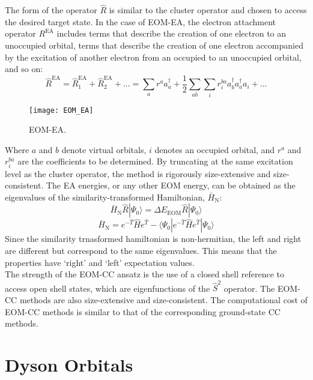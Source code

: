 The form of the operator $\hat{R}$ is similar to the cluster operator and chosen to access the desired target state. In the case of EOM-EA, the electron attachment operator $R^{\text{EA}}$ includes terms that describe the creation of one electron to an unoccupied orbital, terms that describe the creation of one electron accompanied by the excitation of another electron from an occupied to an unoccupied orbital, and so on:
\begin{equation}\label{eq:R_EA}
    \hat{R}^{\mathrm{EA}} = \hat{R}_1^{\mathrm{EA}} + \hat{R}_2^{\mathrm{EA}} + \ldots = \sum_{a} r^a a_a^{\dagger} + \frac{1}{2}\sum_{ab} \sum_{i} r^{ba}_{i} a_b^{\dagger} a_a^{\dagger} a_i + \ldots
\end{equation}
\begin{figure}
    \centering
    \medskip
    \texttt{[image: EOM\_EA]}
    \caption{EOM-EA.}
    \label{fig:EOM}
  \end{figure}
  Where $a$ and $b$ denote virtual orbitals, $i$ denotes an occupied orbital, and $r^a$ and $r^{ba}_{i}$ are the coefficients to be determined. By truncating at the same excitation level as the cluster operator, the method is rigorously size-extensive and size-consistent. The EA energies, or any other EOM energy, can be obtained as the eigenvalues of the similarity-transformed Hamiltonian, $\bar{H}_{\mathrm{N}}$:
\begin{equation}
    \bar{H}_{\mathrm{N}} \hat{R} | \Psi_0 \rangle = \Delta E_{\mathrm{EOM}} \hat{R} | \Psi_0 \rangle
\end{equation}
\begin{equation}
    \bar{H}_{\mathrm{N}} = e^{-\hat{T}} \hat{H} e^{\hat{T}} - \langle \Psi_0 | e^{-\hat{T}} \hat{H} e^{\hat{T}} | \Psi_0 \rangle
\end{equation}
Since the similarity trnasformed hamiltonian is non-hermitian, the left and right are different but correspond to the same eigenvalues. This means that the properties have `right' and `left' expectation values. \\
The strength of the EOM-CC ansatz is the use of a closed shell reference to access open shell states, which are eigenfunctions of the $\hat{S}^2$ operator. The EOM-CC methods are also size-extensive and size-consistent. The computational cost of EOM-CC methods is similar to that of the corresponding ground-state CC methods.

\section{Dyson Orbitals}

